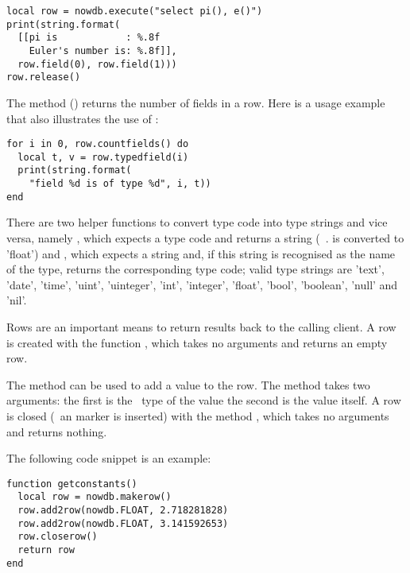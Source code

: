 \begin{lua}
\begin{lstlisting}
local row = nowdb.execute("select pi(), e()")
print(string.format(
  [[pi is            : %.8f
    Euler's number is: %.8f]],
  row.field(0), row.field(1)))
row.release()
\end{lstlisting}
\end{lua}

The method () returns
the number of fields in a row.
Here is a usage example that also
illustrates the use of :

\begin{lua}
\begin{lstlisting}
for i in 0, row.countfields() do
  local t, v = row.typedfield(i)
  print(string.format(
    "field %d is of type %d", i, t))
end
\end{lstlisting}
\end{lua}

There are two helper functions to convert
type code into type strings and vice versa,
namely ,
which expects a type code and returns a string
(\eg\ .  is converted
to 'float') and
, which expects
a string and, if this string is recognised
as the name of the type, returns the corresponding
type code; valid type strings are
'text', 'date', 'time', 'uint', 'uinteger',
'int', 'integer', 'float', 'bool', 'boolean',
'null' and 'nil'.

Rows are an important means to return 
results back to the calling client.
A row is created with the function
, which takes
no arguments and returns an empty row.

The method  can
be used to add a value to the row.
The method takes two arguments:
the first is the \nowdb\ type of the value
the second is the value itself.
A row is closed (\ie\ an  marker
is inserted) with the method
, which takes no arguments
and returns nothing.

The following code snippet is an example:

\begin{lua}
\begin{lstlisting}
function getconstants()
  local row = nowdb.makerow()
  row.add2row(nowdb.FLOAT, 2.718281828)
  row.add2row(nowdb.FLOAT, 3.141592653)
  row.closerow()
  return row
end
\end{lstlisting}
\end{lua}

